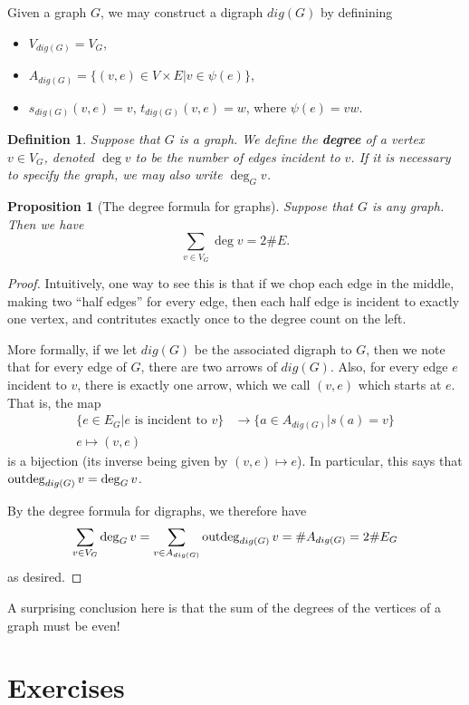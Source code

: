 \documentclass[12pt]{report}
\theoremstyle{plain}
\newtheorem{defn}[thm]{Definition}
\newtheorem{prop}[thm]{Proposition}
\newcommand{\Xb}[1]{\textbf{#1}\index{#1}}
\begin{document}
Given a graph $G$, we may construct a digraph $dig(G)$ by definining
\begin{itemize}
\item $V_{dig(G)} = V_G$,
\item $A_{dig(G)} = \{(v, e) \in V \times E | v \in \psi(e)\}$,
\item $s_{dig(G)}(v, e) = v$, $t_{dig(G)}(v, e) = w$, where $\psi(e) = vw$.
\end{itemize}

\begin{defn}
Suppose that $G$ is a graph. We define the \Xb{degree} of a vertex $v \in
V_G$, denoted $\deg v$ to be the number of edges incident to $v$. If it is
necessary to specify the graph, we may also write $\deg_G v$.
\end{defn}

\begin{prop}[The degree formula for graphs]
Suppose that $G$ is any graph. Then we have
\[\sum_{v \in V_G} \deg v = 2\#E.\]
\end{prop}
\begin{proof}
Intuitively, one way to see this is that if we chop each edge in the
middle, making two ``half edges'' for every edge, then each half edge is
incident to exactly one vertex, and contritutes exactly once to the degree
count on the left.

More formally, if we let $dig(G)$ be the associated digraph to $G$, then we
note that for every edge of $G$, there are two arrows of $dig(G)$. Also,
for every edge $e$ incident to $v$, there is exactly one arrow, which we
call $(v, e)$ which starts at $e$. That is, the map
\begin{align*}
\{e \in E_G | \text{$e$ is incident to $v$}\} &\to \{a \in A_{dig(G)} | s(a)
= v\} \\
e \mapsto (v, e) 
\end{align*}
is a bijection (its inverse being given by $(v, e) \mapsto e$). In
particular, this says that $\operatorname{outdeg}_{dig(G)} v = \deg_G v$.

By the
degree formula for digraphs, we therefore have
\[\sum_{v \in V_G} \deg_G v = \sum_{v \in A_{dig(G)}} \operatorname{outdeg}_{dig(G)} v =
\#A_{dig(G)} = 2\#E_G\]
as desired.
\end{proof}

A surprising conclusion here is that the sum of the degrees of the vertices
of a graph must be even! 

\section{Exercises}
\end{document}
